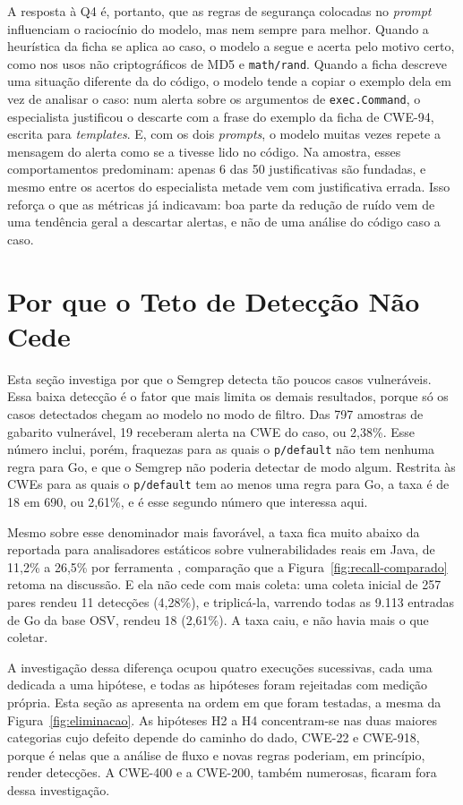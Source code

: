 A resposta à Q4 é, portanto, que as regras de segurança colocadas no \textit{prompt} influenciam o raciocínio do modelo, mas nem sempre para melhor. Quando a heurística da ficha se aplica ao caso, o modelo a segue e acerta pelo motivo certo, como nos usos não criptográficos de MD5 e \texttt{math/rand}. Quando a ficha descreve uma situação diferente da do código, o modelo tende a copiar o exemplo dela em vez de analisar o caso: num alerta sobre os argumentos de \texttt{exec.Command}, o especialista justificou o descarte com a frase do exemplo da ficha de CWE-94, escrita para \textit{templates}. E, com os dois \textit{prompts}, o modelo muitas vezes repete a mensagem do alerta como se a tivesse lido no código. Na amostra, esses comportamentos predominam: apenas 6 das 50 justificativas são fundadas, e mesmo entre os acertos do especialista metade vem com justificativa errada. Isso reforça o que as métricas já indicavam: boa parte da redução de ruído vem de uma tendência geral a descartar alertas, e não de uma análise do código caso a caso.

\section{Por que o Teto de Detecção Não Cede}
\label{sec:eliminacao}

Esta seção investiga por que o Semgrep detecta tão poucos casos vulneráveis. Essa baixa detecção é o fator que mais limita os demais resultados, porque só os casos detectados chegam ao modelo no modo de filtro. Das 797 amostras de gabarito vulnerável, 19 receberam alerta na CWE do caso, ou 2,38\%. Esse número inclui, porém, fraquezas para as quais o \texttt{p/default} não tem nenhuma regra para Go, e que o Semgrep não poderia detectar de modo algum. Restrita às CWEs para as quais o \texttt{p/default} tem ao menos uma regra para Go, a taxa é de 18 em 690, ou 2,61\%, e é esse segundo número que interessa aqui.

Mesmo sobre esse denominador mais favorável, a taxa fica muito abaixo da reportada para analisadores estáticos sobre vulnerabilidades reais em Java, de 11,2\% a 26,5\% por ferramenta \cite{bennett2024semgrep}, comparação que a Figura~\ref{fig:recall-comparado} retoma na discussão. E ela não cede com mais coleta: uma coleta inicial de 257 pares rendeu 11 detecções (4,28\%), e triplicá-la, varrendo todas as 9.113 entradas de Go da base OSV, rendeu 18 (2,61\%). A taxa caiu, e não havia mais o que coletar.

A investigação dessa diferença ocupou quatro execuções sucessivas, cada uma dedicada a uma hipótese, e todas as hipóteses foram rejeitadas com medição própria. Esta seção as apresenta na ordem em que foram testadas, a mesma da Figura~\ref{fig:eliminacao}. As hipóteses H2 a H4 concentram-se nas duas maiores categorias cujo defeito depende do caminho do dado, CWE-22 e CWE-918, porque é nelas que a análise de fluxo e novas regras poderiam, em princípio, render detecções. A CWE-400 e a CWE-200, também numerosas, ficaram fora dessa investigação.

